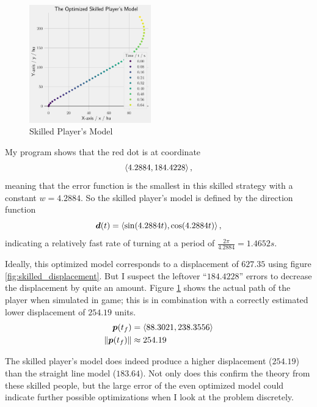 \begin{figure}
    \includegraphics[width=0.47\textwidth,right]{assets/skilled_player.png}
    \caption{Skilled Player's Model}
    \label{fig:skilled_player}
\end{figure}

My program shows that the red dot is at coordinate
\[
    \left\langle 4.2884, 184.4228 \right\rangle,
\]
meaning that the error function is the smallest in this skilled strategy with a constant $w=4.2884$. So the skilled player's model is defined by the direction function
\[
    \boldsymbol{d}(t) = \left\langle \sin(4.2884t), \cos(4.2884t) \right\rangle,
\]
indicating a relatively fast rate of turning at a period of $\frac{2\pi}{4.2884} = 1.4652\si{s}$.


Ideally, this optimized model corresponds to a displacement of $627.35$ using figure \ref{fig:skilled_displacement}. But I suspect the leftover ``$184.4228$'' errors to decrease the displacement by quite an amount. Figure \ref{fig:skilled_player} shows the actual path of the player when simulated in game; this is in combination with a correctly estimated lower displacement of $254.19$ units.
\begin{align*}
    \boldsymbol{p}(t_f) &= \left\langle 88.3021, 238.3556 \right\rangle\\
    \|\boldsymbol{p}(t_f)\| &\approx 254.19
\end{align*}

The skilled player's model does indeed produce a higher displacement ($254.19$) than the straight line model ($183.64$). Not only does this confirm the theory from these skilled people, but the large error of the even optimized model could indicate further possible optimizations when I look at the problem discretely.
